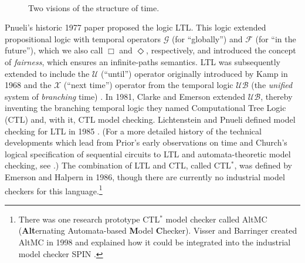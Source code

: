 \documentclass{elsarticle} %
\begin{document}

\begin{wrapfigure}{r}{2in}
\mbox{}\\
\mbox{}
\caption{Two visions of the structure of time.}
\end{wrapfigure}


Pnueli's historic 1977 paper \cite{Pnu77} proposed the logic LTL. This logic extended propositional logic with temporal operators $\mathcal{G}$ (for ``globally'') and $\mathcal{F}$ (for ``in the future''), which we also call $\Box$ and $\Diamond$, respectively, and introduced the concept of \emph{fairness}, which ensures an infinite-paths semantics. LTL was subsequently extended to include the $\mathcal{U}$ (``until'') operator originally introduced by Kamp in 1968 \cite{Kam68} and the $\mathcal{X}$ (``next time'') operator from the temporal logic $\mathscr{UB}$ (the \emph{unified} system of \emph{branching} time) \cite{BM81}. %
In 1981, Clarke and Emerson extended $\mathscr{UB}$, thereby inventing the branching temporal logic they named Computational Tree Logic (CTL) and, with it, CTL model checking. 
Lichtenstein and Pnueli defined model checking for LTL in 1985 \cite{LP85}. 
(For a more detailed history of the technical developments which lead from Prior's early observations on time and Church's logical specification of sequential circuits to LTL and automata-theoretic model checking, see \cite{Var06b}.)
The combination of LTL and CTL, called CTL$^*$, was defined by Emerson and Halpern in 1986, though there are currently no industrial model checkers for this language.\footnote{There was one research prototype CTL$^*$ model checker called AltMC ({\bf Alt}ernating Automata-based {\bf M}odel {\bf C}hecker). Visser and Barringer created AltMC in 1998 and explained how it could be integrated into the industrial model checker SPIN \cite{VB00}.}
\end{document}
